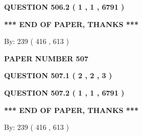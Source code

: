 \documentclass[12pt]{article}
\begin{document}
{\textbf{\Large{QUESTION
506.2 
 ( 1 , 1 , 6791 )
}}}
  
  
   
   
 \vspace{0.2in}
 
   
   
   
   
\vspace{1.0in} 
{\textbf{\large{ *** END OF PAPER, THANKS *** }}} 
   
   
\hspace{1.0in} By: 
 239 ( 416 ,  613 )
   
   
   
   
\newpage 
\setcounter{page}{ 
   507001 } 
   
   
   
   
 {\textbf{ \Large{ PAPER NUMBER  507  }}}
   
   
\vspace{0.2in}
   
   
   
   
   
   
 \vspace{0.2in}
 
 
 
 
   
   
  
\vspace{0.2in}
  
{\textbf{\Large{QUESTION
507.1 
 ( 2 , 2 , 3 )
}}}
  
  
  
\vspace{0.2in}
  
{\textbf{\Large{QUESTION
507.2 
 ( 1 , 1 , 6791 )
}}}
  
  
   
   
 \vspace{0.2in}
 
   
   
   
   
\vspace{1.0in} 
{\textbf{\large{ *** END OF PAPER, THANKS *** }}} 
   
   
\hspace{1.0in} By: 
 239 ( 416 ,  613 )
   
   
   
   
\newpage 
\setcounter{page}{ 
   508001 } 
   
   
   
\end{document}
